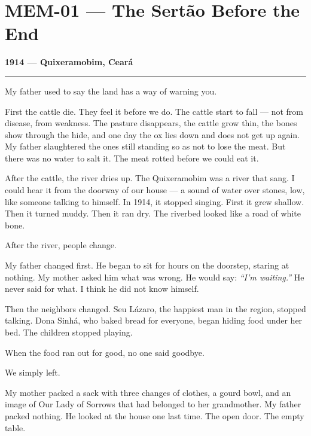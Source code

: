 \section*{\textbf{MEM-01} --- The Sertão Before the End}


\noindent \textbf{1914 --- Quixeramobim, Ceará}

\vspace{0.5em}\noindent\rule{\textwidth}{0.5pt}\vspace{0.5em}

\noindent My father used to say the land has a way of warning you.

\noindent First the cattle die. They feel it before we do. The cattle start to fall --- not from disease, from weakness. The pasture disappears, the cattle grow thin, the bones show through the hide, and one day the ox lies down and does not get up again. My father slaughtered the ones still standing so as not to lose the meat. But there was no water to salt it. The meat rotted before we could eat it.

\noindent After the cattle, the river dries up. The Quixeramobim was a river that sang. I could hear it from the doorway of our house --- a sound of water over stones, low, like someone talking to himself. In 1914, it stopped singing. First it grew shallow. Then it turned muddy. Then it ran dry. The riverbed looked like a road of white bone.

\noindent After the river, people change.

\noindent My father changed first. He began to sit for hours on the doorstep, staring at nothing. My mother asked him what was wrong. He would say: \textit{\textquotedblleft{}I'm waiting.\textquotedblright{}} He never said for what. I think he did not know himself.

\noindent Then the neighbors changed. Seu Lázaro, the happiest man in the region, stopped talking. Dona Sinhá, who baked bread for everyone, began hiding food under her bed. The children stopped playing.

\noindent When the food ran out for good, no one said goodbye.

\noindent We simply left.

\noindent My mother packed a sack with three changes of clothes, a gourd bowl, and an image of Our Lady of Sorrows that had belonged to her grandmother. My father packed nothing. He looked at the house one last time. The open door. The empty table.

